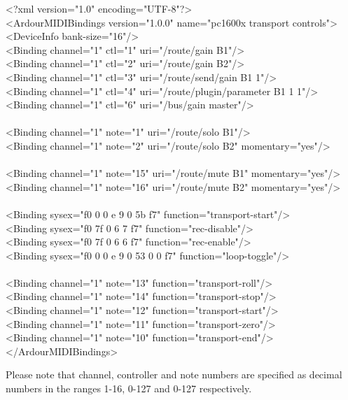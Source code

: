 \documentclass[10pt,a4paper]{book}
\begin{document}
\begin{listing}
<?xml version="1.0" encoding="UTF-8"?>\\
<ArdourMIDIBindings version="1.0.0" name="pc1600x transport controls">\\
<DeviceInfo bank-size="16"/>\\
<Binding channel="1" ctl="1"   uri="/route/gain B1"/>\\
<Binding channel="1" ctl="2"   uri="/route/gain B2"/>\\
<Binding channel="1" ctl="3"   uri="/route/send/gain B1 1"/>\\
<Binding channel="1" ctl="4"   uri="/route/plugin/parameter B1 1 1"/>\\
<Binding channel="1" ctl="6"   uri="/bus/gain master"/>\\
\\
<Binding channel="1" note="1"  uri="/route/solo B1"/>\\
<Binding channel="1" note="2"  uri="/route/solo B2" momentary="yes"/>\\
\\
<Binding channel="1" note="15"  uri="/route/mute B1" momentary="yes"/>\\
<Binding channel="1" note="16"  uri="/route/mute B2" momentary="yes"/>\\
\\
<Binding sysex="f0 0 0 e 9 0 5b f7" function="transport-start"/>\\
<Binding sysex="f0 7f 0 6 7 f7" function="rec-disable"/>\\
<Binding sysex="f0 7f 0 6 6 f7" function="rec-enable"/>\\
<Binding sysex="f0 0 0 e 9 0 53 0 0 f7" function="loop-toggle"/>\\
\\
<Binding channel="1" note="13" function="transport-roll"/>\\
<Binding channel="1" note="14" function="transport-stop"/>\\
<Binding channel="1" note="12" function="transport-start"/>\\
<Binding channel="1" note="11" function="transport-zero"/>\\
<Binding channel="1" note="10" function="transport-end"/>\\
</ArdourMIDIBindings>\\
\end{listing}

Please note that channel, controller and note numbers are specified as
decimal numbers in the ranges 1-16, 0-127 and 0-127 respectively.
\end{document}
